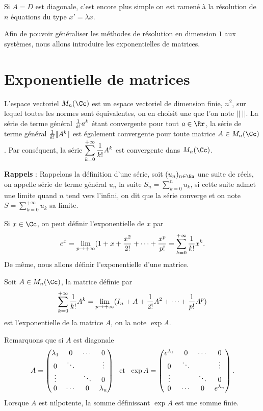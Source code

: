 \documentclass[class=report,crop=false]{standalone}
\begin{document}
Si $A=D$ est diagonale, c'est encore plus simple on est ramené 
à la résolution de $n$ équations du type $x'=\lambda x$.

Afin de pouvoir généraliser les méthodes de résolution en 
dimension $1$ aux systèmes, nous allons introduire les 
exponentielles de matrices.


\section{Exponentielle de matrices}

L'espace vectoriel $M_n(\Cc)$ est un espace vectoriel de 
dimension finie, $n^2$, sur lequel toutes les normes sont 
équivalentes, on en choisit une que l'on note $|\!|\ |\!|$. 
La série de terme général ${{1}\over{k!}}a^k$ étant convergente 
pour tout $a\in \Rr$, la série de terme général ${{1}\over{k!}}|\!|A^k|\!|$ 
est également convergente pour toute matrice $A\in M_n(\Cc)$. 
Par conséquent, la série $\displaystyle \sum_{k=0}^{+\infty}{{1}\over{k!}}A^k$ 
est convergente dans $M_n(\Cc)$.

{\bf Rappels} : Rappelons la définition d'une série, soit 
$(u_n)_{n\in\Nn}$ une suite de réels, on appelle série de terme 
général $u_n$ la suite $S_n=\sum_{k=0}^{n}u_k$, si cette suite 
admet une limite quand $n$ tend vers l'infini, on dit que la 
série converge et on note $S=\sum_{k=0}^{+\infty}u_k$ sa limite.

Si $x\in\Cc$, on peut définir l'exponentielle de $x$ par 
$$e^x=\lim_{p\rightarrow+\infty}(1+x+{{x^2}\over{2!}}+\dots
+{{x^p}\over{p!}}=\sum_{k=0}^{+\infty}{{1}\over{k!}}x^k.$$ 
De même, nous allons définir l'exponentielle d'une matrice.

 \begin{definition}\end{definition} Soit $A\in M_n(\Cc)$, 
 la matrice définie par
$$\sum_{k=0}^{+\infty}{{1}\over{k!}}A^k
=\lim_{p\rightarrow +\infty}(I_n+A+{{1}\over{2!}}A^2+\cdots+{{1}\over{p!}}A^p)$$
est l'exponentielle de la matrice $A$, on la note $\exp A$.


Remarquons que si $A$ est diagonale
$$A=\left(\begin{matrix}\lambda_1&0&\cdots &0\cr0& \ddots & &\vdots \cr
\vdots & &\ddots&0\cr 0&\cdots&0&\lambda_n\end{matrix}\right)
\ \ {\hbox{et}}\ \ \exp A
=\left(\begin{matrix}e^{\lambda_1}&0&\cdots &0\cr
0& \ddots & &\vdots \cr\vdots & &\ddots&0\cr
0&\cdots&0&e^{\lambda_n}\end{matrix}\right).$$
Lorsque $A$ est nilpotente, la somme définissant $\exp A$ est une somme finie.
\end{document}
